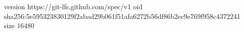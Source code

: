 version https://git-lfs.github.com/spec/v1
oid sha256:5e595323830129f2abad29b061f51afa6272b56df86b2ec9e769f958c4372241
size 16480
